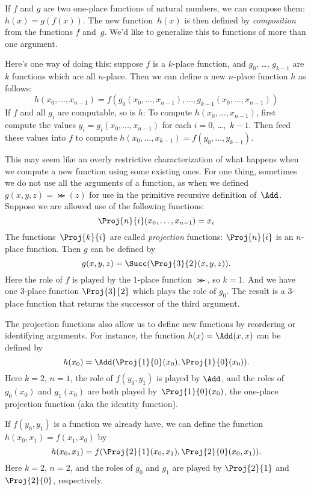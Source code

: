\documentclass[../../../include/open-logic-section]{subfiles}
\begin{document}

If $f$ and $g$ are two one-place functions of natural numbers, we can
compose them: $h(x) = g(f(x))$. The new
function~$h(x)$ is then defined by \emph{composition} from the
functions $f$ and~$g$. We'd like to generalize this to functions of
more than one argument.

Here's one way of doing this: suppose $f$ is a $k$-place function,
and $g_0$, \dots, $g_{k-1}$ are $k$ functions which are all
$n$-place. Then we can define a new $n$-place function $h$ as follows:
\[
h(x_0, \dots, x_{n-1}) =
f(g_0(x_0, \dots, x_{n-1}), \dots, g_{k-1}(x_0, \dots, x_{n-1}))
\]
If $f$ and all $g_i$ are computable, so is $h$: To compute $h(x_0,
\dots, x_{n-1})$, first compute the values $y_i = g_i(x_0, \dots,
x_{n-1})$ for each $i = 0$, \dots,~$k-1$. Then feed these values into
$f$ to compute $h(x_0, \dots, x_{k-1}) = f(y_0, \dots, y_{k-1})$.

This may seem like an overly restrictive characterization of what
happens when we compute a new function using some existing ones. For
one thing, sometimes we do not use all the arguments of a function, as
when we defined $g(x, y, z) = \Succ(z)$ for use in the primitive
recursive definition of~$\Add$. Suppose we are allowed use of the
following functions:
\[
\Proj{n}{i}(x_0, \dots, x_{n-1}) = x_i
\]
The functions~$\Proj{k}{i}$ are called \emph{projection} functions:
$\Proj{n}{i}$ is an $n$-place function. Then $g$ can be defined by
\[
g(x, y, z) = \Succ(\Proj{3}{2}(x, y, z)).
\]
Here the role of $f$ is played by the $1$-place function $\Succ$, so
$k=1$. And we have one $3$-place function $\Proj{3}{2}$ which plays
the role of $g_0$. The result is a $3$-place function that returns the
successor of the third argument.

The projection functions also allow us to define new functions by
reordering or identifying arguments. For instance, the function $h(x)
= \Add(x, x)$ can be defined by
\[
h(x_0) = \Add(\Proj{1}{0}(x_0),\Proj{1}{0}(x_0)).
\]
Here $k=2$, $n=1$, the role of $f(y_0,y_1)$ is played by $\Add$, and
the roles of $g_0(x_0)$ and $g_1(x_0)$ are both played
by~$\Proj{1}{0}(x_0)$, the one-place projection function (aka the
identity function).

If $f(y_0, y_1)$ is a function we already have, we can define the
function $h(x_0, x_1) = f(x_1, x_0)$ by
\[
h(x_0, x_1) = f(\Proj{2}{1}(x_0, x_1),\Proj{2}{0}(x_0, x_1)).
\]
Here $k=2$, $n = 2$, and the roles of $g_0$ and $g_1$ are played by
$\Proj{2}{1}$ and~$\Proj{2}{0}$, respectively.
\end{document}
